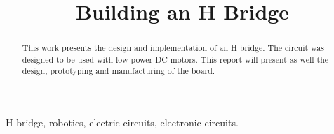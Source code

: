 \documentclass[journal]{IEEEtran}
\newcommand{\toDo}[1]{\textcolor{red}{#1}}
\begin{document}
    \title{Building an H Bridge}
    
    \author{
        }
    
    \maketitle
    
    \begin{abstract}
        
        This work presents the design and implementation of an H bridge. The circuit was designed to be used with low power DC motors. This report will present as well the design, prototyping and manufacturing of the board.
                
    \end{abstract}
    
    \begin{IEEEkeywords}
        H bridge, robotics, electric circuits, electronic circuits.        
    \end{IEEEkeywords}
    
 
    
    
    
    
    
    
    
\end{document}
